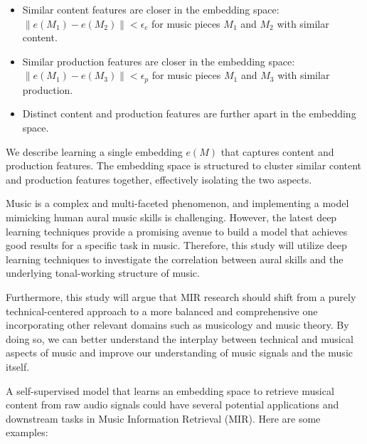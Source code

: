 \begin{itemize}
  \item Similar content features are closer in the embedding space: $\|e(M_1) - e(M_2)\| < \epsilon_c$ for music pieces $M_1$ and $M_2$ with similar content.
  \item Similar production features are closer in the embedding space: $\|e(M_1) - e(M_3)\| < \epsilon_p$ for music pieces $M_1$ and $M_3$ with similar production.
  \item Distinct content and production features are further apart in the embedding space.
\end{itemize}

We describe learning a single embedding $e(M)$ that captures content and production features. The embedding space is structured to cluster similar content and production features together, effectively isolating the two aspects.

Music is a complex and multi-faceted phenomenon, and implementing a model mimicking human aural music skills is challenging. However, the latest deep learning techniques provide a promising avenue to build a model that achieves good results for a specific task in music. Therefore, this study will utilize deep learning techniques to investigate the correlation between aural skills and the underlying tonal-working structure of music.

Furthermore, this study will argue that MIR research should shift from a purely technical-centered approach to a more balanced and comprehensive one incorporating other relevant domains such as musicology and music theory. By doing so, we can better understand the interplay between technical and musical aspects of music and improve our understanding of music signals and the music itself.


A self-supervised model that learns an embedding space to retrieve musical content from raw audio signals could have several potential applications and downstream tasks in Music Information Retrieval (MIR). Here are some examples:

